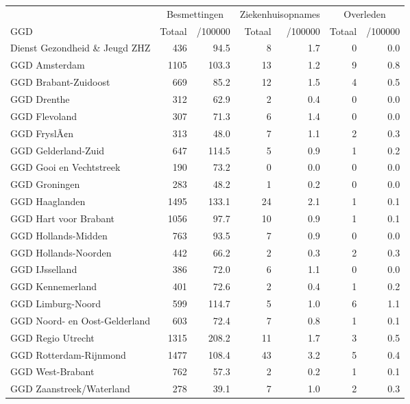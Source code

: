 \documentclass[
  english,
  man,floatsintext]{apa6}
\begin{document}
\begin{table}
\centering\begingroup\fontsize{10}{12}\selectfont

\begin{threeparttable}
\begin{tabular}{lrrrrrr}
\toprule
\multicolumn{1}{c}{ } & \multicolumn{2}{c}{Besmettingen} & \multicolumn{2}{c}{Ziekenhuisopnames} & \multicolumn{2}{c}{Overleden} \\
\cmidrule(l{3pt}r{3pt}){2-3} \cmidrule(l{3pt}r{3pt}){4-5} \cmidrule(l{3pt}r{3pt}){6-7}
GGD & Totaal & /100000 & Totaal & /100000 & Totaal & /100000\\
\midrule
Dienst Gezondheid \& Jeugd ZHZ & 436 & 94.5 & 8 & 1.7 & 0 & 0.0\\
GGD Amsterdam & 1105 & 103.3 & 13 & 1.2 & 9 & 0.8\\
GGD Brabant-Zuidoost & 669 & 85.2 & 12 & 1.5 & 4 & 0.5\\
GGD Drenthe & 312 & 62.9 & 2 & 0.4 & 0 & 0.0\\
GGD Flevoland & 307 & 71.3 & 6 & 1.4 & 0 & 0.0\\
GGD FryslÃ¢n & 313 & 48.0 & 7 & 1.1 & 2 & 0.3\\
GGD Gelderland-Zuid & 647 & 114.5 & 5 & 0.9 & 1 & 0.2\\
GGD Gooi en Vechtstreek & 190 & 73.2 & 0 & 0.0 & 0 & 0.0\\
GGD Groningen & 283 & 48.2 & 1 & 0.2 & 0 & 0.0\\
GGD Haaglanden & 1495 & 133.1 & 24 & 2.1 & 1 & 0.1\\
GGD Hart voor Brabant & 1056 & 97.7 & 10 & 0.9 & 1 & 0.1\\
GGD Hollands-Midden & 763 & 93.5 & 7 & 0.9 & 0 & 0.0\\
GGD Hollands-Noorden & 442 & 66.2 & 2 & 0.3 & 2 & 0.3\\
GGD IJsselland & 386 & 72.0 & 6 & 1.1 & 0 & 0.0\\
GGD Kennemerland & 401 & 72.6 & 2 & 0.4 & 1 & 0.2\\
GGD Limburg-Noord & 599 & 114.7 & 5 & 1.0 & 6 & 1.1\\
GGD Noord- en Oost-Gelderland & 603 & 72.4 & 7 & 0.8 & 1 & 0.1\\
GGD Regio Utrecht & 1315 & 208.2 & 11 & 1.7 & 3 & 0.5\\
GGD Rotterdam-Rijnmond & 1477 & 108.4 & 43 & 3.2 & 5 & 0.4\\
GGD West-Brabant & 762 & 57.3 & 2 & 0.2 & 1 & 0.1\\
GGD Zaanstreek/Waterland & 278 & 39.1 & 7 & 1.0 & 2 & 0.3\\

\end{tabular}
\end{threeparttable}
\end{table}
\end{document}
